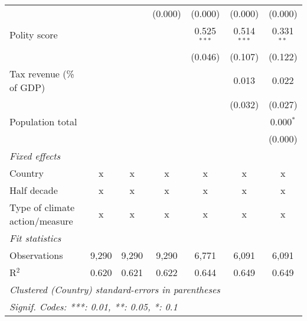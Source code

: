 \begin{tabular}{lcccccc}
                                                                                          &         &                & (0.000)        & (0.000)        & (0.000)        & (0.000)\\   
   Polity score                                                                           &         &                &                & 0.525$^{***}$  & 0.514$^{***}$  & 0.331$^{**}$\\   
                                                                                          &         &                &                & (0.046)        & (0.107)        & (0.122)\\   
   Tax revenue (\% of GDP)                                                                &         &                &                &                & 0.013          & 0.022\\   
                                                                                          &         &                &                &                & (0.032)        & (0.027)\\   
   Population total                                                                       &         &                &                &                &                & 0.000$^{*}$\\   
                                                                                          &         &                &                &                &                & (0.000)\\   
   \emph{Fixed effects}\\
   Country                                                                                & x       & x              & x              & x              & x              & x\\  
   Half decade                                                                            & x       & x              & x              & x              & x              & x\\  
   Type of climate action/measure                                                         & x       & x              & x              & x              & x              & x\\  
   \midrule \emph{Fit statistics}\\
   Observations                                                                           & 9,290   & 9,290          & 9,290          & 6,771          & 6,091          & 6,091\\  
   R$^2$                                                                                  & 0.620   & 0.621          & 0.622          & 0.644          & 0.649          & 0.649\\  
   \midrule
   \multicolumn{7}{l}{\emph{Clustered (Country) standard-errors in parentheses}}\\
   \multicolumn{7}{l}{\emph{Signif. Codes: ***: 0.01, **: 0.05, *: 0.1}}\\
\end{tabular}
\par\endgroup


